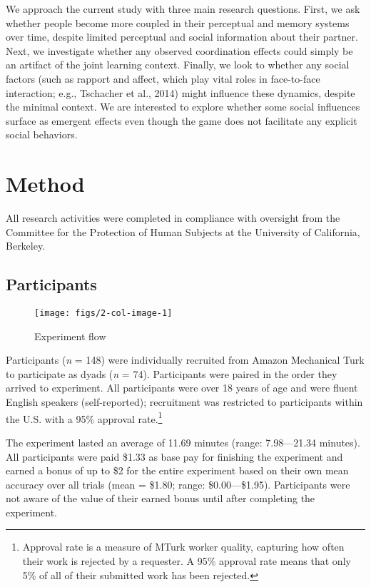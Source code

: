 \documentclass[10pt, letterpaper]{article}
\newenvironment{CodeChunk}{}{}
\begin{document}
We approach the current study with three main research questions. First,
we ask whether people become more coupled in their perceptual and memory
systems over time, despite limited perceptual and social information
about their partner. Next, we investigate whether any observed
coordination effects could simply be an artifact of the joint learning
context. Finally, we look to whether any social factors (such as rapport
and affect, which play vital roles in face-to-face interaction; e.g.,
Tschacher et al., 2014) might influence these dynamics, despite the
minimal context. We are interested to explore whether some social
influences surface as emergent effects even though the game does not
facilitate any explicit social behaviors.

\section{Method}\label{method}

All research activities were completed in compliance with oversight from
the Committee for the Protection of Human Subjects at the University of
California, Berkeley.

\subsection{Participants}\label{participants}

\begin{CodeChunk}
\begin{figure*}[h]

{\centering \texttt{[image: figs/2-col-image-1]} 

}

\caption[Experiment flow]{Experiment flow}\label{fig:2-col-image}
\end{figure*}
\end{CodeChunk}

Participants (\emph{n} = 148) were individually recruited from Amazon
Mechanical Turk to participate as dyads (\emph{n} = 74). Participants
were paired in the order they arrived to experiment. All participants
were over 18 years of age and were fluent English speakers
(self-reported); recruitment was restricted to participants within the
U.S. with a 95\% approval
rate.\footnote{Approval rate is a measure of MTurk worker quality, capturing how often their work is rejected by a requester. A 95\% approval rate means that only 5\% of all of their submitted work has been rejected.}

The experiment lasted an average of 11.69 minutes (range: 7.98---21.34
minutes). All participants were paid \$1.33 as base pay for finishing
the experiment and earned a bonus of up to \$2 for the entire experiment
based on their own mean accuracy over all trials (mean = \$1.80; range:
\$0.00---\$1.95). Participants were not aware of the value of their
earned bonus until after completing the experiment.
\end{document}
